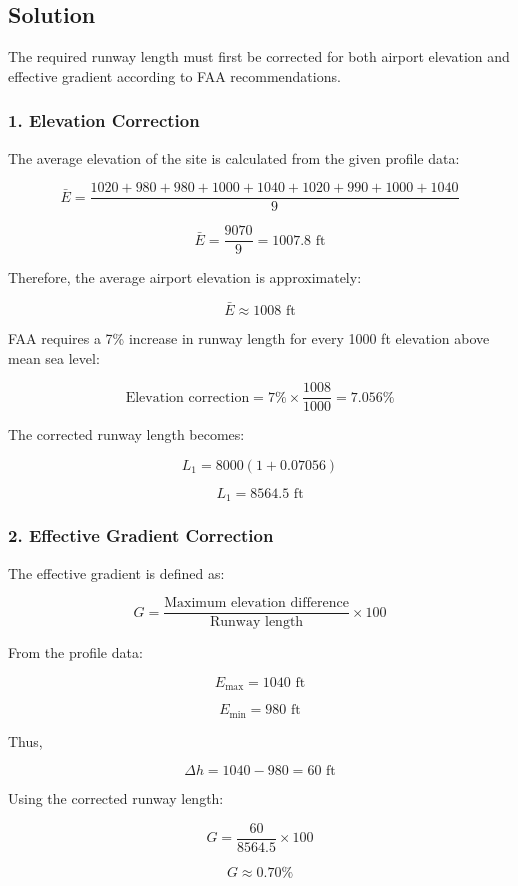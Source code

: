 \documentclass{KPS_assignment}
\begin{document}
\begin{enumerate}
\subsection*{Solution}

The required runway length must first be corrected for both airport elevation and effective gradient according to FAA recommendations.

\subsubsection*{1. Elevation Correction}

The average elevation of the site is calculated from the given profile data:

\[
\bar{E} =
\frac{1020+980+980+1000+1040+1020+990+1000+1040}{9}
\]

\[
\bar{E} =
\frac{9070}{9}
=
1007.8 \text{ ft}
\]

Therefore, the average airport elevation is approximately:

\[
\bar{E} \approx 1008 \text{ ft}
\]

FAA requires a 7\% increase in runway length for every 1000 ft elevation above mean sea level:

\[
\text{Elevation correction}
=
7\% \times \frac{1008}{1000}
=
7.056\%
\]

The corrected runway length becomes:

\[
L_1
=
8000(1+0.07056)
\]

\[
L_1
=
8564.5 \text{ ft}
\]

\subsubsection*{2. Effective Gradient Correction}

The effective gradient is defined as:

\[
G =
\frac{\text{Maximum elevation difference}}{\text{Runway length}}
\times 100
\]

From the profile data:

\[
E_{\max}=1040 \text{ ft}
\]

\[
E_{\min}=980 \text{ ft}
\]

Thus,

\[
\Delta h = 1040-980=60 \text{ ft}
\]

Using the corrected runway length:

\[
G
=
\frac{60}{8564.5}\times100
\]

\[
G \approx 0.70\%
\]


\end{enumerate}
\end{document}
